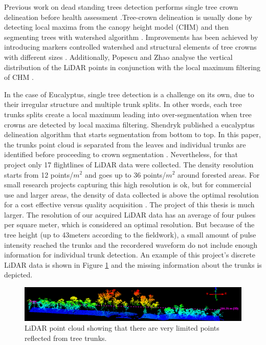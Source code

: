 \documentclass{subfiles}
\begin{document}
\par Previous work on dead standing trees detection performs single tree crown delineation before health assessment \cite{Yao2012} \cite{Shendryk2016_DeadTrees}.Tree-crown delineation is usually done by detecting local maxima from the canopy height model (CHM) and then segmenting trees with watershed algorithm \cite{Popescu2003}. Improvements has been achieved by introducing markers controlled watershed \cite{Jing2012} and structural elements of tree crowns with different sizes \cite{Hu2014}. Additionally, Popescu and Zhao analyse the vertical distribution of the LiDAR points in conjunction with the local maximum filtering of CHM \cite{Popescu2008}.


 \par  In the case of Eucalyptus, single tree detection is a challenge on its own, due to their irregular structure and multiple trunk splits. In other words, each tree trunks splits create a local maximum leading into over-segmentation when tree crowns are detected by local maxima filtering. Shendryk published a eucalyptus delineation algorithm that starts segmentation from bottom to top. In this paper, the trunks point cloud is separated from the leaves and individual trunks are identified before proceeding to crown segmentation \cite{Shendryk2016_treeDeliniation}. {\color{blue} Nevertheless, for that project only 17 flightlines of LiDAR data were collected. The density resolution starts from 12 points/$m^2$ and goes up to 36 points/$m^2$ around forested areas. For small research projects capturing this high resolution is ok, but for commercial use and larger areas, the density of data collected is above the optimal resolution for a cost effective versus quality acquisition \cite{Lovell2005}. The project of this thesis is much larger. The resolution of our acquired LiDAR data has an average of four pulses per square meter, which is considered an optimal resolution.} But because of the tree height (up to 43meters according to the fieldwork), a small amount of pulse intensity reached the trunks and the recordered waveform do not include enough information for individual trunk detection.  An example of this project's discrete LiDAR data is shown in Figure \ref{fig:NoTrunks} and the missing information about the trunks is depicted.
 
   	\begin{figure} [h!]
   		\centering
   		\includegraphics[trim={7cm 0 1.7cm 0},clip,width=\textwidth]{img/TreesNoTrunks}
   		\caption{LiDAR point cloud showing that there are very limited points reflected from tree trunks.}
   		\label{fig:NoTrunks}
   	\end{figure}
   	
\end{document}
